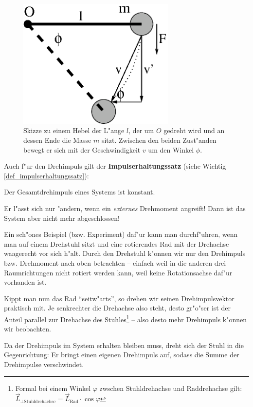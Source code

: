 \begin{figure}
   \centering
   \includegraphics[width=0.7\textwidth]{bilder/hebel02}
   \caption[Hebel]{Skizze zu einem Hebel der L"ange $l$, der um $O$
     gedreht wird und an dessen Ende die Masse $m$ sitzt. Zwischen den
     beiden Zust"anden bewegt er sich mit der Geschwindigkeit $v$ um
     den Winkel $\phi$.}
   \label{abb_hebel}
\end{figure}


Auch f"ur den Drehimpuls gilt der \textbf{Impulserhaltungssatz} (siehe
Wichtig \ref{def_impulserhaltungssatz}):
\begin{Wichtig}
    Der
   Gesamtdrehimpuls eines Systems ist konstant.
\end{Wichtig}
Er l"asst sich nur "andern, wenn ein \emph{externes} Drehmoment
angreift! Dann ist das System aber nicht mehr abgeschlossen!



\begin{Beispiel}
Ein sch"ones Beispiel (bzw. Experiment) daf"ur kann man durchf"uhren,
wenn man auf einem Drehstuhl sitzt und eine rotierendes Rad mit der
Drehachse waagerecht vor sich h"alt. Durch den Drehstuhl k"onnen wir nur
den Drehimpuls bzw. Drehmoment nach oben betrachten -- einfach weil
in die anderen drei Raumrichtungen nicht rotiert werden kann, weil
keine Rotationsachse daf"ur vorhanden ist.

Kippt man nun das Rad "`seitw"arts"', so drehen wir seinen
Drehimpulsvektor praktisch mit. Je senkrechter die Drehachse also
steht, desto gr"o"ser ist der Anteil parallel zur Drehachse des
Stuhles\footnote{Formal bei einem Winkel $\varphi$ zwschen
  Stuhldrehachse und Raddrehachse gilt: $\vec L_{\bot
    \text{Stuhldrehachse}} = \vec L_{\text{Rad}} \cdot \cos \varphi$}
-- also desto mehr Drehimpuls k"onnen wir beobachten.

Da der Drehimpuls im System erhalten bleiben muss, dreht sich der Stuhl
in die Gegenrichtung: Er bringt einen eigenen Drehimpuls auf, sodass
die Summe der Drehimpulse verschwindet.   
\end{Beispiel}







